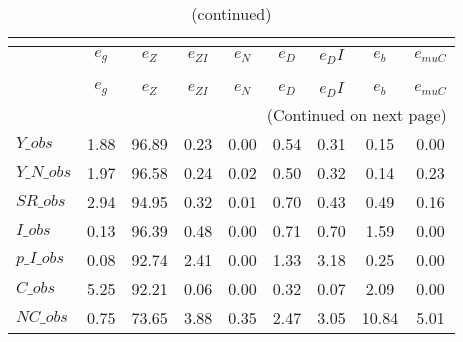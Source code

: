  
\begin{center}
\begin{longtable}{lcccccccc} 
\caption{VARIANCE DECOMPOSITION (in percent)}\\
 \label{Table:th_var_decomp_uncond}\\
\toprule 
$               $	 & 	 $        {e_g}$	 & 	 $        {e_Z}$	 & 	 $     {e_{ZI}}$	 & 	 $        {e_N}$	 & 	 $        {e_D}$	 & 	 $       {e_DI}$	 & 	 $        {e_b}$	 & 	 $    {e_{muC}}$\\
\midrule \endfirsthead 
\caption{(continued)}\\
 \toprule \\ 
$               $	 & 	 $        {e_g}$	 & 	 $        {e_Z}$	 & 	 $     {e_{ZI}}$	 & 	 $        {e_N}$	 & 	 $        {e_D}$	 & 	 $       {e_DI}$	 & 	 $        {e_b}$	 & 	 $    {e_{muC}}$\\
\midrule \endhead 
\midrule \multicolumn{9}{r}{(Continued on next page)} \\ \bottomrule \endfoot 
\bottomrule \endlastfoot 
$Y\_obs         $	 & 	         1.88	 & 	        96.89	 & 	         0.23	 & 	         0.00	 & 	         0.54	 & 	         0.31	 & 	         0.15	 & 	         0.00 \\ 
$Y\_N\_obs      $	 & 	         1.97	 & 	        96.58	 & 	         0.24	 & 	         0.02	 & 	         0.50	 & 	         0.32	 & 	         0.14	 & 	         0.23 \\ 
$SR\_obs        $	 & 	         2.94	 & 	        94.95	 & 	         0.32	 & 	         0.01	 & 	         0.70	 & 	         0.43	 & 	         0.49	 & 	         0.16 \\ 
$I\_obs         $	 & 	         0.13	 & 	        96.39	 & 	         0.48	 & 	         0.00	 & 	         0.71	 & 	         0.70	 & 	         1.59	 & 	         0.00 \\ 
$p\_I\_obs      $	 & 	         0.08	 & 	        92.74	 & 	         2.41	 & 	         0.00	 & 	         1.33	 & 	         3.18	 & 	         0.25	 & 	         0.00 \\ 
$C\_obs         $	 & 	         5.25	 & 	        92.21	 & 	         0.06	 & 	         0.00	 & 	         0.32	 & 	         0.07	 & 	         2.09	 & 	         0.00 \\ 
$NC\_obs        $	 & 	         0.75	 & 	        73.65	 & 	         3.88	 & 	         0.35	 & 	         2.47	 & 	         3.05	 & 	        10.84	 & 	         5.01 \\ 

\end{longtable}
\end{center}
